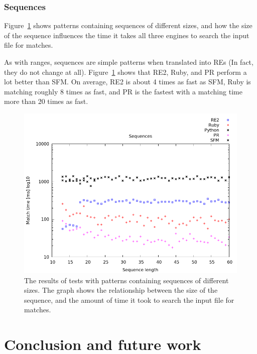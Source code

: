 \documentclass[12pt]{article}
\theoremstyle{definition}
\begin{document}
\subsubsection{Sequences}

Figure~\ref{graph:cases:sequences} shows patterns containing sequences of different sizes, and how the size of the sequence influences the time it takes all three engines to search the input file for matches.

As with ranges, sequences are simple patterns when translated into REs (In fact, they do not change at all). Figure~\ref{graph:cases:sequences} shows that RE2, Ruby, and PR perform a lot better than SFM. On average, RE2 is about 4 times as fast as SFM, Ruby is matching roughly 8 times as fast, and PR is the fastest with a matching time more than 20 times as fast.

\begin{figure}[H]
	\begin{center}
		\includegraphics[scale=0.55]{graphs/sequences.png}	
	\end{center}
	\caption{The results of tests with patterns containing sequences of different sizes. The graph shows the relationship between the size of the sequence, and the amount of time it took to search the input file for matches.}
	\label{graph:cases:sequences}
\end{figure}

\section{Conclusion and future work}
\end{document}
